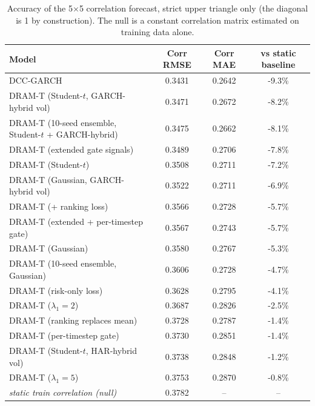\begin{table}
\caption{Accuracy of the 5$\times$5 correlation forecast, strict upper triangle only (the diagonal is 1 by construction). The null is a constant correlation matrix estimated on training data alone.}
\label{tab:correlation}
\begin{tabular}{lccc}
\toprule
Model & Corr RMSE & Corr MAE & vs static baseline \\
\midrule
DCC-GARCH & 0.3431 & 0.2642 & -9.3\% \\
DRAM-T (Student-$t$, GARCH-hybrid vol) & 0.3471 & 0.2672 & -8.2\% \\
DRAM-T (10-seed ensemble, Student-$t$ + GARCH-hybrid) & 0.3475 & 0.2662 & -8.1\% \\
DRAM-T (extended gate signals) & 0.3489 & 0.2706 & -7.8\% \\
DRAM-T (Student-$t$) & 0.3508 & 0.2711 & -7.2\% \\
DRAM-T (Gaussian, GARCH-hybrid vol) & 0.3522 & 0.2711 & -6.9\% \\
DRAM-T (+ ranking loss) & 0.3566 & 0.2728 & -5.7\% \\
DRAM-T (extended + per-timestep gate) & 0.3567 & 0.2743 & -5.7\% \\
DRAM-T (Gaussian) & 0.3580 & 0.2767 & -5.3\% \\
DRAM-T (10-seed ensemble, Gaussian) & 0.3606 & 0.2728 & -4.7\% \\
DRAM-T (risk-only loss) & 0.3628 & 0.2795 & -4.1\% \\
DRAM-T ($\lambda_1=2$) & 0.3687 & 0.2826 & -2.5\% \\
DRAM-T (ranking replaces mean) & 0.3728 & 0.2787 & -1.4\% \\
DRAM-T (per-timestep gate) & 0.3730 & 0.2851 & -1.4\% \\
DRAM-T (Student-$t$, HAR-hybrid vol) & 0.3738 & 0.2848 & -1.2\% \\
DRAM-T ($\lambda_1=5$) & 0.3753 & 0.2870 & -0.8\% \\
\textit{static train correlation (null)} & 0.3782 & -- & -- \\
\bottomrule
\end{tabular}
\end{table}
